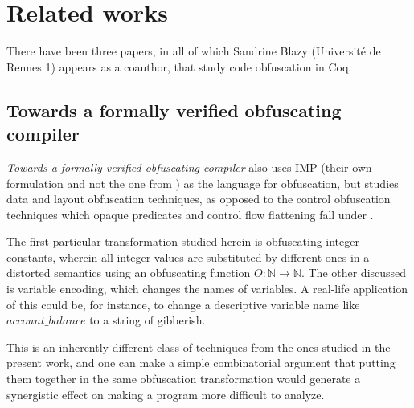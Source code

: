 \documentclass[compsoc,conference,a4paper,10pt,times]{IEEEtran}
\begin{document}
\section{Related works}
There have been three papers, in all of which Sandrine Blazy (Universit\'{e} de Rennes 1) appears as a coauthor, that study code obfuscation in Coq.

\subsection*{Towards a formally verified obfuscating compiler}
\par \emph{Towards a formally verified obfuscating compiler} \cite{Blazy1} also uses IMP (their own formulation and not the one from \cite{SFV2}) as the language for obfuscation, but studies data and layout obfuscation techniques, as opposed to the control obfuscation techniques which opaque predicates and control flow flattening fall under \cite{CollbergTax}.
\par The first particular transformation studied herein is obfuscating integer constants, wherein all integer values are substituted by different ones in a distorted semantics using an obfuscating function $O: \mathbb{N} \to \mathbb{N}$.  The other discussed is variable encoding, which changes the names of variables.  A real-life application of this could be, for instance, to change a descriptive variable name like $account\_balance$ to a string of gibberish.
\par This is an inherently different class of techniques from the ones studied in the present work, and one can make a simple combinatorial argument that putting them together in the same obfuscation transformation would generate a synergistic effect on making a program more difficult to analyze.
\end{document}
